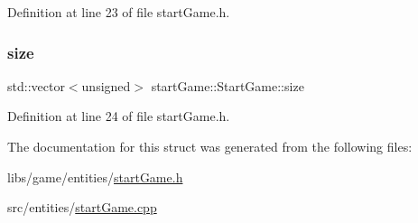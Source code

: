 Definition at line 23 of file start\+Game.\+h.

\mbox{\label{structstart_game_1_1_start_game_a17f51b9a759839975438d56fcf3f1176}} 
\subsubsection{\texorpdfstring{size}{size}}
{\footnotesize\ttfamily std\+::vector$<$unsigned$>$ start\+Game\+::\+Start\+Game\+::size}



Definition at line 24 of file start\+Game.\+h.



The documentation for this struct was generated from the following files\+:\begin{DoxyCompactItemize}
\item 
libs/game/entities/\hyperlink{start_game_8h}{start\+Game.\+h}\item 
src/entities/\hyperlink{start_game_8cpp}{start\+Game.\+cpp}\end{DoxyCompactItemize}
